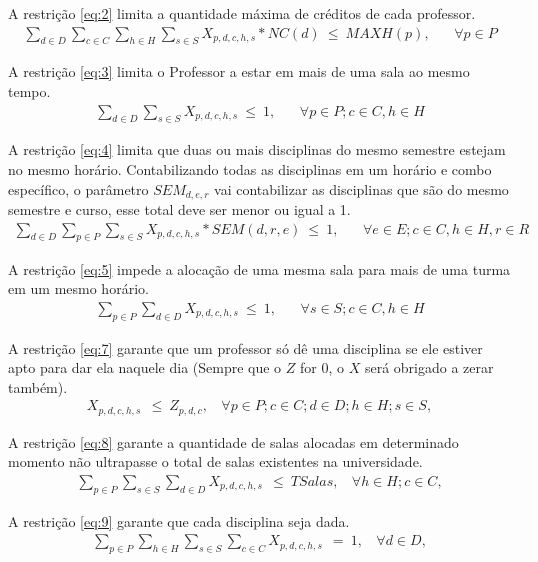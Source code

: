 A restrição \ref{eq:2} limita a quantidade máxima de créditos de cada professor.
\begin{align}
	\sum_{d \in D} \sum_{c \in C} \sum_{h \in H} \sum_{s \in S} X_{p, d, c, h, s} * NC(d) \ \leq \ MAXH(p), & \ \ \ \ \forall p \in P \label{eq:2}
\end{align}

A restrição \ref{eq:3} limita o Professor a estar em mais de uma sala ao mesmo tempo.
\begin{align}
	\sum_{d \in D} \sum_{s \in S} X_{p, d, c, h, s} \ \leq \ 1, & \ \ \ \ \forall p \in P; c \in C, h \in H \label{eq:3}
\end{align}

A restrição \ref{eq:4} limita que duas ou mais disciplinas do mesmo semestre estejam no mesmo horário. Contabilizando todas as disciplinas em um horário e combo específico, o parâmetro $SEM_{d, e, r}$ vai contabilizar as disciplinas que são do mesmo semestre e curso, esse total deve ser menor ou igual a 1.
\begin{align}
		\sum_{d \in D} \sum_{p \in P} \sum_{s \in S} X_{p, d, c, h, s} * SEM(d,r,e)\ \leq \ 1, & \ \ \ \ \forall e \in E; c \in C, h \in H, r \in R \label{eq:4}
\end{align}

A restrição \ref{eq:5} impede a alocação de uma mesma sala para mais de uma turma em um mesmo horário.
\begin{align}
	\sum_{p \in P} \sum_{d \in D} X_{p, d, c, h, s} \ \leq \ 1, & \ \ \ \ \forall s \in S; c \in C, h \in H \label{eq:5}
\end{align}

A restrição \ref{eq:7} garante que um professor só dê uma disciplina se ele estiver apto para dar ela naquele dia (Sempre que o $Z$ for 0, o $X$ será obrigado a zerar também).
\begin{align}
	X_{p, d, c, h, s} \ \ \leq \ Z_{p, d, c}, \ \ \ \ \forall p \in P; c \in C; d \in D; h \in H; s \in S,  \label{eq:7}
\end{align}

A restrição \ref{eq:8} garante a quantidade de salas alocadas em determinado momento não ultrapasse o total de salas existentes na universidade.
\begin{align}
	\sum_{p \in P} \sum_{s \in S} \sum_{d \in D} X_{p, d, c, h, s} \ \ \leq \ TSalas, \ \ \ \ \forall h \in H; c \in C,  \label{eq:8}
\end{align}

A restrição \ref{eq:9} garante que cada disciplina seja dada.
\begin{align}
	\sum_{p \in P} \sum_{h \in H} \sum_{s \in S} \sum_{c \in C} X_{p, d, c, h, s} \ \ = \ 1, \ \ \ \ \forall d \in D, \label{eq:9}
\end{align}

